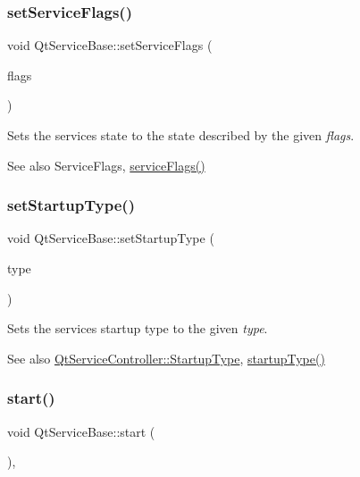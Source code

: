 \subsubsection{\texorpdfstring{set\+Service\+Flags()}{setServiceFlags()}}
{\footnotesize\ttfamily void Qt\+Service\+Base\+::set\+Service\+Flags (\begin{DoxyParamCaption}\item[{Service\+Flags}]{flags }\end{DoxyParamCaption})}

Sets the service\textquotesingle{}s state to the state described by the given {\itshape flags}.

\begin{DoxySeeAlso}{See also}
Service\+Flags, \hyperlink{class_qt_service_base_aab0b204981c481e098fe72061e3f367a}{service\+Flags()} 
\end{DoxySeeAlso}
\mbox{\label{class_qt_service_base_a6beddd54c973c3a7d81075b2f3f80df2}} 
\subsubsection{\texorpdfstring{set\+Startup\+Type()}{setStartupType()}}
{\footnotesize\ttfamily void Qt\+Service\+Base\+::set\+Startup\+Type (\begin{DoxyParamCaption}\item[{\hyperlink{class_qt_service_controller_a946ac2b079d9760503da923c2eaf0aac}{Qt\+Service\+Controller\+::\+Startup\+Type}}]{type }\end{DoxyParamCaption})}

Sets the service\textquotesingle{}s startup type to the given {\itshape type}.

\begin{DoxySeeAlso}{See also}
\hyperlink{class_qt_service_controller_a946ac2b079d9760503da923c2eaf0aac}{Qt\+Service\+Controller\+::\+Startup\+Type}, \hyperlink{class_qt_service_base_aa1b3bf9b7fc09777b422f49f7bcfbcbe}{startup\+Type()} 
\end{DoxySeeAlso}
\mbox{\label{class_qt_service_base_adbc0cd621b41bd3a6a1f62fda432e9e4}} 
\subsubsection{\texorpdfstring{start()}{start()}}
{\footnotesize\ttfamily void Qt\+Service\+Base\+::start (\begin{DoxyParamCaption}\item[{void}]{ }\end{DoxyParamCaption})\hspace{0.3cm}{\ttfamily [protected]}, {}}

